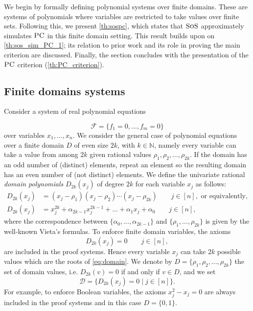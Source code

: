 \documentclass[11pt]{article}
\newcommand{\sos}{\text{\sc{SoS}}}
\newcommand{\F}{\mathcal{F}}
\newcommand{\PC}{\textsc{PC}}
\newcommand{\N}{\mathbb{N}}
\newcommand{\1}{\textbf{1}}
\newcommand{\Do}{\mathcal{D}}
\begin{document}
We begin by formally defining polynomial systems over finite domains. These are systems of polynomials where variables are restricted to take values over finite sets. Following this, we present \cref{th:sospc}, which states that $\sos$ approximately simulates $\PC$ in this finite domain setting. This result builds upon on \cref{th:sos_sim_PC_1}; its relation to prior work and its role in proving the main criterion are discussed. Finally, the section concludes with the presentation of the $\PC$ criterion (\cref{th:PC_criterion}). 

\subsection{Finite domains systems}
Consider a system of real polynomial equations

\begin{equation}\label{eq:Psystem}
\F=\{f_1=0,\ldots,f_m=0\}    
\end{equation}
over variables $x_1,\ldots,x_n$.
We consider the general case of polynomial equations over a finite domain $D$ of even size $2k$, with $k\in \N$, namely every variable can take a value from among $2k$ given rational values $\rho_{1},\rho_{2},\ldots,\rho_{2k}$. If the domain has an odd number of (distinct) elements, repeat an element so the resulting domain has an even number of (not distinct) elements.
We define the univariate rational \emph{domain polynomials} $D_{2k}(x_j)$ of degree $2k$ for each variable $x_j$ as follows: 
\begin{align}
D_{2k}(x_j)&=(x_j-\rho_{1})(x_j-\rho_{2})\cdots (x_j-\rho_{2k}) \qquad j\in[n], \textrm{ or equivalently,}    \label{eq:domain_f_roots}\\
D_{2k}(x_j)&=x_j^{2k}+\alpha_{2k-1}x_j^{2k-1}+\dots + \alpha_1 x_j + \alpha_0 \qquad j\in[n], \label{eq:domain_f}   
\end{align}
where the correspondence between $\{\alpha_0,\ldots,\alpha_{2k-1}\}$ and $\{\rho_1,\ldots,\rho_{2k}\}$ is given by the well-known Vieta's formulas.
To enforce finite domain variables, the axioms
\begin{equation}\label{eq:domain}
D_{2k}(x_j)=0 \qquad j\in[n],    
\end{equation}
are included in the proof systems. 
Hence every variable $x_j$ can take $2k$ possible values which are the roots of \cref{eq:domain}. We denote by $D=\{\rho_1, \rho_2, \dots, \rho_{2k}\}$ the set of domain values, i.e. $D_{2k}(v)=0$ if and only if $v\in D$, and we set
\begin{equation}\label{eq:D}
    \Do=\{D_{2k}(x_j)=0\mid j\in[n]\}.
\end{equation}
For example, to enforce Boolean variables, the axioms $x^2_j - x_j=0$ are always included in the proof systems and in this case $D=\{0,1\}$. 
\end{document}
